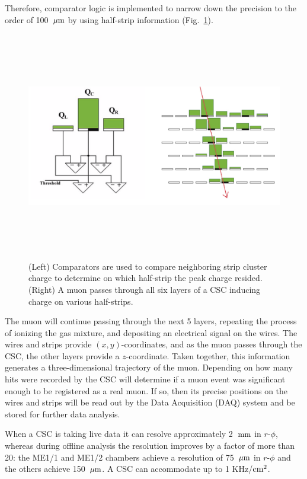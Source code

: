 Therefore, comparator logic is implemented to narrow down the precision to the order of 100~$\mu\text{m}$ by using half-strip information (Fig.~\ref{fig:comparators}).
\begin{figure}[pbth]
\centering
\includegraphics[width=15cm,height=10cm,keepaspectratio]{figures/cms/muonsys/csc_comparators_and_strips.png}
    \caption{
    (Left) Comparators are used to compare neighboring strip cluster charge to determine on which half-strip the peak charge resided.
    (Right) A muon passes through all six layers of a CSC inducing charge on various half-strips.
    }
    \label{fig:comparators}
\end{figure}
The muon will continue passing through the next 5 layers, repeating the process of ionizing the gas mixture, and depositing an electrical signal on the wires. 
The wires and strips provide $(x,y)$-coordinates, and as the muon passes through the CSC, the other layers provide a $z$-coordinate.
Taken together, this information generates a three-dimensional trajectory of the muon.
Depending on how many hits were recorded by the CSC will determine if a muon event was significant enough to be registered as a real muon. 
If so, then its precise positions on the wires and strips will be read out by the Data Acquisition (DAQ) system and be stored for further data analysis.

When a CSC is taking live data it can resolve approximately 2~$\text{mm}$ in $r$-$\phi$, whereas during offline analysis the resolution improves by a factor of more than 20:
the ME1/1 and ME1/2 chambers achieve a resolution of 75~$\mu\text{m}$ in $r$-$\phi$ and the others achieve 150~$\mu\text{m}$.
A CSC can accommodate up to 1 KHz/$\text{cm}^2$.

